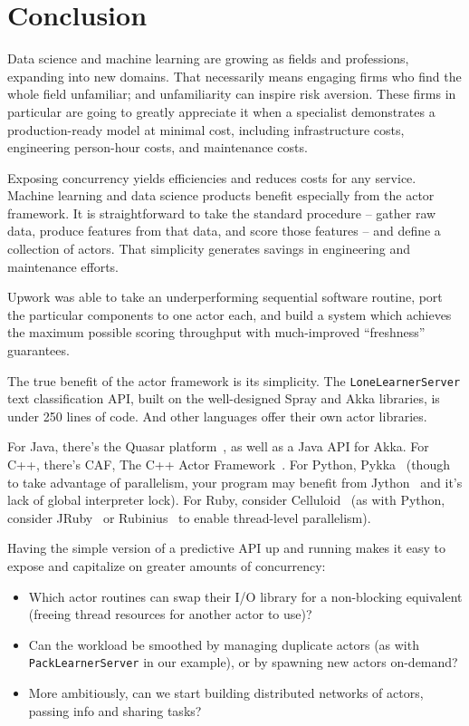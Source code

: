 \documentclass{article}
\begin{document}
\section{Conclusion}

Data science and machine learning are growing as fields and professions, 
expanding into new domains. That necessarily means engaging firms who 
find the whole field unfamiliar; and unfamiliarity can inspire risk aversion. 
These firms in particular are going to greatly appreciate it when a specialist
demonstrates a production-ready model at minimal cost, including infrastructure
costs, engineering person-hour costs, and maintenance costs.

Exposing concurrency yields efficiencies and reduces costs for any service.
Machine learning and data science products benefit especially from the actor 
framework. It is straightforward to take the standard procedure -- gather raw data, 
produce features from that data, and score those features -- and define a collection 
of actors. That simplicity generates savings in engineering and maintenance efforts.

Upwork was able to take an underperforming sequential software routine, port the
particular components to one actor each, and build a system which achieves the
maximum possible scoring throughput with much-improved ``freshness'' guarantees.

The true benefit of the actor framework is its simplicity. The \texttt{LoneLearnerServer}
text classification API, built on the well-designed Spray and Akka libraries, is under 
250 lines of code. And other languages offer their own actor libraries.

For Java, there's the Quasar platform~\cite{quasar_doc}, as well as a Java API for
Akka. For C++, there's CAF, The C++ Actor Framework~\cite{charousset2014caf}.
For Python, Pykka~\cite{pykka_doc} (though to take advantage of parallelism,
your program may benefit from Jython~\cite{jython} and it's lack of global interpreter
lock). For Ruby, consider Celluloid~\cite{celluloid_doc} (as with Python, consider 
JRuby~\cite{jruby_doc} or Rubinius~\cite{rubinius_doc} to enable thread-level
parallelism).


Having the simple version of a predictive API up and running
makes it easy to expose and capitalize on greater amounts of concurrency:
\begin{itemize}
\item Which actor routines can swap their I/O library for a non-blocking equivalent
(freeing thread resources for another actor to use)? 
\item Can the workload be smoothed by managing duplicate actors (as with
 \texttt{PackLearnerServer} in our example), or by spawning new actors 
 on-demand? 
\item More ambitiously, can we start building distributed networks of actors, passing 
info and sharing tasks?
\end{itemize}
\end{document}
